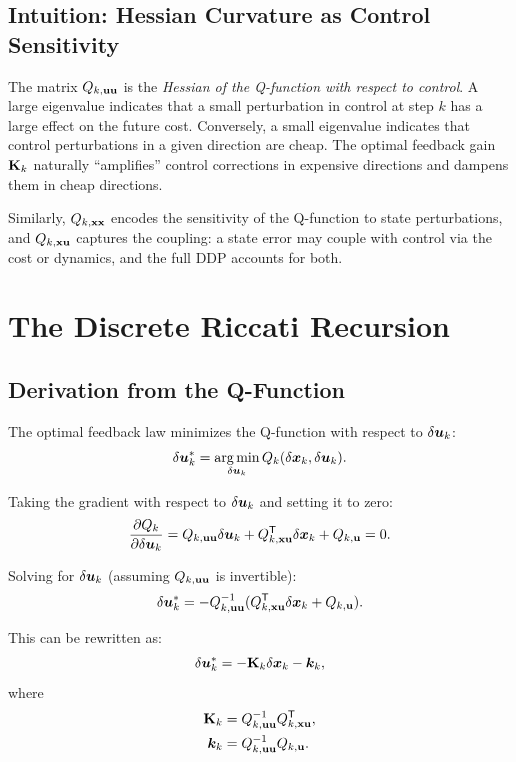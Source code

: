 \subsection{Intuition: Hessian Curvature as Control Sensitivity}

The matrix $Q_{k,\mathbf{u}\mathbf{u}}$ is the \emph{Hessian of the Q-function with respect to control}. A large eigenvalue indicates
that a small perturbation in control at step $k$ has a large effect on the future cost. Conversely, a small
eigenvalue indicates that control perturbations in a given direction are cheap. The optimal feedback gain $\mathbf{K}_k$
naturally ``amplifies'' control corrections in expensive directions and dampens them in cheap directions.

Similarly, $Q_{k,\mathbf{x}\mathbf{x}}$ encodes the sensitivity of the Q-function to state perturbations, and $Q_{k,\mathbf{x}\mathbf{u}}$ captures
the coupling: a state error may couple with control via the cost or dynamics, and the full DDP accounts for both.

\section{The Discrete Riccati Recursion}

\subsection{Derivation from the Q-Function}

The optimal feedback law minimizes the Q-function with respect to $\delta\bm{u}_k$:
\begin{equation}
\delta\bm{u}_k^* = \operatorname*{arg\,min}_{\delta\bm{u}_k} Q_k(\delta\bm{x}_k,\delta\bm{u}_k).
\label{eq:ch5:optimal-control}
\end{equation}

Taking the gradient with respect to $\delta\bm{u}_k$ and setting it to zero:
\begin{equation}
\frac{\partial Q_k}{\partial \delta\bm{u}_k} = Q_{k,\mathbf{u}\mathbf{u}}\delta\bm{u}_k + Q_{k,\mathbf{x}\mathbf{u}}^{\mathsf{T}}\delta\bm{x}_k + Q_{k,\mathbf{u}} = 0.
\label{eq:ch5:control-optim}
\end{equation}

Solving for $\delta\bm{u}_k$ (assuming $Q_{k,\mathbf{u}\mathbf{u}}$ is invertible):
\begin{equation}
\delta\bm{u}_k^* = -Q_{k,\mathbf{u}\mathbf{u}}^{-1}(Q_{k,\mathbf{x}\mathbf{u}}^{\mathsf{T}}\delta\bm{x}_k + Q_{k,\mathbf{u}}).
\label{eq:ch5:optimal-control-explicit}
\end{equation}

This can be rewritten as:
\begin{equation}
\delta\bm{u}_k^* = -\mathbf{K}_k\delta\bm{x}_k - \bm{k}_k,
\label{eq:ch5:feedback-affine}
\end{equation}
where
\begin{align}
\mathbf{K}_k &= Q_{k,\mathbf{u}\mathbf{u}}^{-1}Q_{k,\mathbf{x}\mathbf{u}}^{\mathsf{T}}, \label{eq:ch5:gain-def}\\
\bm{k}_k &= Q_{k,\mathbf{u}\mathbf{u}}^{-1}Q_{k,\mathbf{u}}. \label{eq:ch5:feedforward-def}
\end{align}

